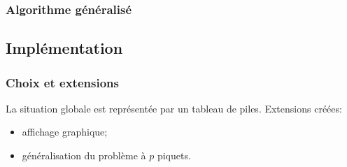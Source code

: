 \documentclass{beamer}%
\begin{document}
			\begin{frame}
				\frametitle{Algorithme généralisé}
				\begin{figure}
					\centering
					\setcounter{subfigure}{0}
					\qquad
				\end{figure}	
				\begin{figure}
					\centering
					\qquad
				\end{figure}
			\end{frame}
			
		\subsection{Implémentation}
			\begin{frame}
				\frametitle{Choix et extensions}
				La situation globale est représentée par un tableau de piles.
				\bigbreak
				Extensions créées:
				\begin{itemize}
					\item affichage graphique;
					\item généralisation du problème à $p$ piquets.
				\end{itemize}
			\end{frame}
			
\end{document}
